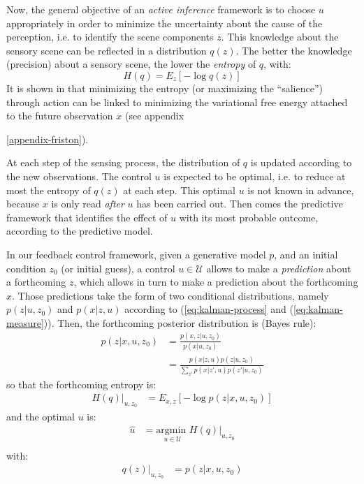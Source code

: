 \documentclass[12pt,twoside,openright]{article}
\begin{document}
	Now, the general objective of an \emph{active inference} framework is to choose $u$ appropriately in order to minimize the uncertainty about the cause of the perception, i.e. to identify the scene components $z$. 
	This knowledge about the sensory scene can be reflected in a distribution $q(z)$. The better the knowledge (precision) about a sensory scene, the lower the \emph{entropy} of $q$, with:
	$$H(q) = E_z[- \log q(z)]$$
	It is shown in \cite{friston2012perceptions} that minimizing the entropy (or maximizing the ``salience'') through action can be linked to minimizing the variational free energy attached to the future observation $x$ (see appendix{\ref{appendix-friston}).
		
		
	
	At each step of the sensing process, the distribution of $q$ is updated according to the new observations. The control $u$ is expected to be optimal, i.e. to reduce at most the entropy of $q(z)$ at each step. This optimal $u$ is not known in advance, because $x$ is only read \emph{after} $u$ has been carried out. Then comes the predictive framework that identifies the effect of $u$ with its most probable outcome, according to the predictive model.
	
	In our feedback control framework, given a generative model $p$, and an initial condition $z_0$ (or initial guess), a control $u \in \mathcal{U}$ allows to make a \emph{prediction} about a forthcoming $z$, which allows in turn to make a prediction about the forthcoming $x$. Those predictions take the form of two conditional distributions, namely $p(z|u,z_0)$ and $p(x|z,u)$ according to (\ref{eq:kalman-process} and (\ref{eq:kalman-measure})). %
	Then, the forthcoming posterior distribution is (Bayes rule):
	\begin{align*}
	p(z|x,u,z_0) &= \frac{p(x,z|u,z_0)}{p(x|u,z_0)}\\
	             &= \frac{p(x|z,u) p(z|u,z_0)}{\sum_{z'}p(x|z',u) p(z'|u,z_0)}
	\end{align*}
	so that the forthcoming entropy is:
	\begin{align*}
	H(q)|_{u, z_0} &=  E_{x,z}\left[-\log  p(z|x,u,z_0)\right]
	\end{align*}
	and the optimal $u$ is:
	\begin{align*}
	\hat{u} &= \underset{u \in \mathcal{U}}{\text{argmin }} H(q)|_{u, z_0} \\
	\end{align*}
	with:
	\begin{align*}
		q(z)|_{u,z_0} &= p(z|x,u,z_0) \\
	\end{align*}
	
}
\end{document}
